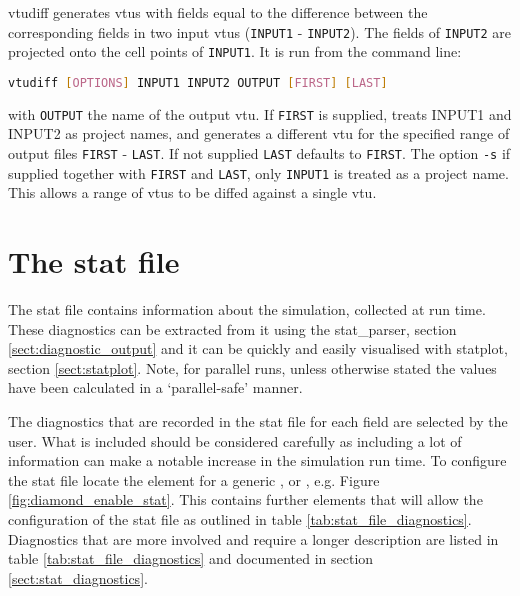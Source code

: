 vtudiff generates vtus with fields equal to the difference between the corresponding fields in two input vtus (\lstinline[language = Bash]+INPUT1+ - \lstinline[language = Bash]+INPUT2+). The fields of \lstinline[language = Bash]+INPUT2+ are projected onto the cell points of \lstinline[language = Bash]+INPUT1+. It is run from the command line:
\begin{lstlisting}[language = Bash]
vtudiff [OPTIONS] INPUT1 INPUT2 OUTPUT [FIRST] [LAST]
\end{lstlisting}
with \lstinline[language = Bash]+OUTPUT+ the name of the output vtu. If \lstinline[language = Bash]+FIRST+ is supplied, treats INPUT1 and INPUT2 as project names, and generates a different vtu for the specified range of output files \lstinline[language = Bash]+FIRST+ - \lstinline[language = Bash]+LAST+. If not supplied \lstinline[language = Bash]+LAST+ defaults to \lstinline[language = Bash]+FIRST+. The option \lstinline[language = Bash]+-s+ if supplied together with \lstinline[language = Bash]+FIRST+ and \lstinline[language = Bash]+LAST+, only \lstinline[language = Bash]+INPUT1+ is treated as a project name. This allows a range of vtus to be diffed against a single vtu.


\section{The stat file}
\label{sect:diagnostics_stat_file}

The stat file contains information about the simulation, collected at run time. These diagnostics can be extracted from it using the stat\_parser, section \ref{sect:diagnostic_output} and it can be quickly and easily visualised with statplot, section \ref{sect:statplot}. Note, for parallel runs, unless otherwise stated the values have been calculated in a `parallel-safe' manner.

The diagnostics that are recorded in the stat file for each field are selected by the user.  What is included should be considered carefully as including a lot of information can make a notable increase in the simulation run time. To configure the stat file locate the  element for a generic ,  or , e.g. Figure \ref{fig:diamond_enable_stat}. This contains further elements that will allow the configuration of the stat file as outlined in table \ref{tab:stat_file_diagnostics}. Diagnostics that are more involved and require a longer description are listed in table \ref{tab:stat_file_diagnostics} and documented in section \ref{sect:stat_diagnostics}.

